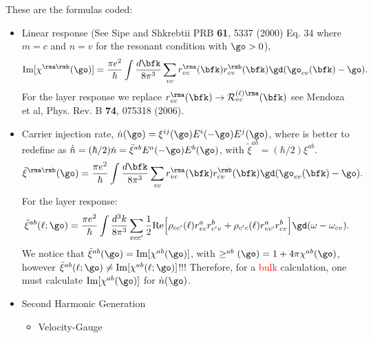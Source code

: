 \documentclass[12pt,leqno]{article}
\numberwithin{equation}{section}
\begin{document}
These are the formulas coded:

\begin{itemize}

\item Linear response (See Sipe and Shkrebtii PRB {\bf 61}, 5337 (2000) Eq. 34
where $m=c$ and $n=v$ for the resonant condition with $\go>0$),
\begin{equation*}\label{chif}
\mathrm{Im}[\chi^{\rma\rmb}(\go)]=\frac{\pi e^2}{\hbar}
\int \frac{d\bfk}{8\pi^3}
\sum_{vc}
r^{\rma}_{vc}(\bfk)r^{\rmb}_{cv}(\bfk)\gd(\go_{cv}(\bfk)-\go)
.
\end{equation*} 
For the layer response we replace $r^{\rma}_{vc}(\bfk)\to{\cal
 R}^{(\ell)\rma}_{vc}(\bfk)$ see Mendoza et al, Phys. Rev. B {\bf 74},
075318 (2006).

\item Carrier injection rate, 
$\dot n(\go)=\xi^{ij}(\go)E^i(-\go)E^j(\go)$,
where is better to redefine as $\dot{\tilde n}=(\hbar/2)\dot n=\tilde\xi^{ab}E^a(-\go)E^b(\go)$, with
$\tilde\xi^{ab}=(\hbar/2)\xi^{ab}$.
\begin{equation*}\label{chifp}
\tilde\xi^{\rma\rmb}(\go)=\frac{\pi e^2}{\hbar}
\int \frac{d\bfk}{8\pi^3}
\sum_{vc}
r^{\rma}_{vc}(\bfk)r^{\rmb}_{cv}(\bfk)\gd(\go_{cv}(\bfk)-\go)
.
\end{equation*} 
For the layer response:
\begin{equation*}\label{xizn}
\tilde\xi^{ab}(\ell;\go)
=
\frac{\pi e^2}{\hbar}
\int\frac{d^3k}{8\pi^3}
\sum_{vcc'}
\frac{1}{2}\mathrm{Re}\Big[
\rho_{cc'}(\ell)    
r^a_{vc} 
r^b_{c'v}
+
\rho_{c'c}(\ell) 
r^a_{vc'} 
r^b_{cv}
\Big]
\gd(\omega-\omega_{cv})
.
\end{equation*}
We notice that $\tilde\xi^{ab}(\go)=\mathrm{Im}[\chi^{ab}(\go)]$, with
$\ge^{ab}(\go)=1+4\pi\chi^{ab}(\go)$, however 
$\tilde\xi^{ab}(\ell;\go)\neq\mathrm{Im}[\chi^{ab}(\ell;\go)]$!!!
Therefore, for a \textcolor{red}{bulk} calculation, one must calculate
$\mathrm{Im}[\chi^{ab}(\go)]$ for $\dot n(\go)$.

\item Second Harmonic Generation
\begin{itemize}
\item Velocity-Gauge 


\end{itemize}
\end{itemize}
\end{document}

